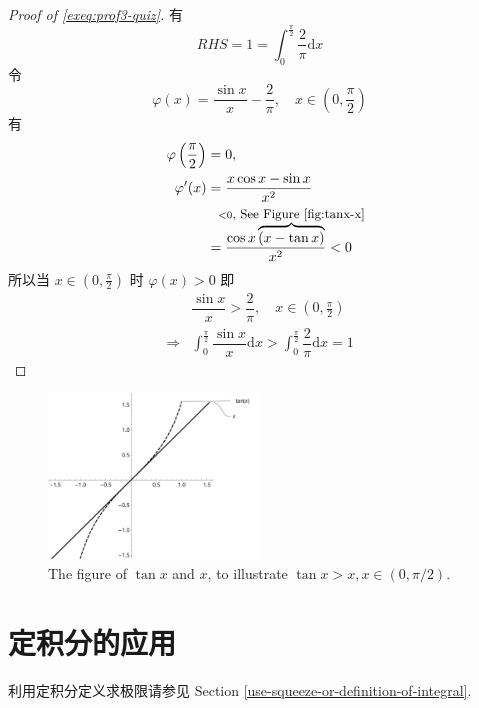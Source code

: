 \begin{example}
    \begin{proof}[Proof of \ref{exeq:prof3-quiz}]
        有
        \[
            RHS = 1 = \int_0^{\frac{\pi}{2}} \dfrac{2}{\pi} \mathrm dx
        \]
        令
        \[
            \varphi(x) = \frac{\sin x}{x} -\frac{2}{\pi}, \quad x \in \left(0, \frac{\pi}{2}\right)
        \]
        有
        \begin{align*}
            \varphi\left(\frac{\pi}{2}\right) &= 0, \\
            \varphi'(x) &= \dfrac{x \cos x - \sin x}{x^2}\\
                        &= \dfrac{\cos x \overbrace{(x - \tan x)}^{\mathclap{<0 \mbox{\small, See Figure \ref{fig:tanx-x}}}}}{x^2} < 0
        \end{align*}
        所以当 $x \in \left(0, \frac{\pi}{2}\right)$ 时 $\varphi(x)>0$
        即
        \begin{align*}
            &\dfrac{\sin x}{x} > \dfrac{2}{\pi}, \quad x \in \left(0, \frac{\pi}{2}\right) \\
            \Rightarrow &\int_0^{\frac{\pi}{2}} \dfrac{\sin x}{x} \mathrm dx > \int_0^{\frac{\pi}{2}} \dfrac{2}{\pi} \mathrm dx = 1
        \end{align*}
    \end{proof}
\end{example}

\begin{figure}
    \centering
    \includegraphics[width=0.5\textwidth]{figure/tanx-x.pdf}
    \caption{The figure of $\tan x$ and $x$, to illustrate $\tan x > x, x \in (0, \pi/2)$.}
    \label{fig:tanx-x}
\end{figure}

\section{定积分的应用}\label{app-finite-integral}

利用定积分定义求极限请参见
Section \ref{use-squeeze-or-definition-of-integral}.

